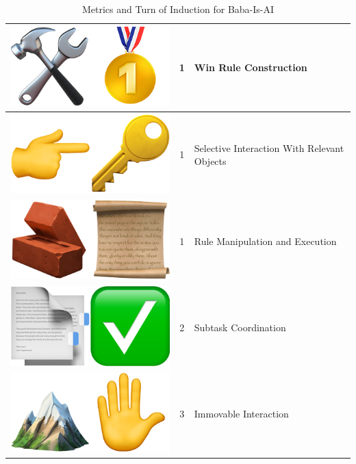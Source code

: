 \begin{table}
\begin{tabular}{ccl}
\midrule
\rowcolor{gray!30} \includegraphics[scale=0.07]{figs/emojis/emoji_5.png} & 1 & Win Rule Construction \\
\midrule
\rowcolor{gray!30} \includegraphics[scale=0.07]{figs/emojis/emoji_6.png} & 1 & Selective Interaction With Relevant Objects  \\
\midrule
\rowcolor{gray!30} \includegraphics[scale=0.07]{figs/emojis/emoji_7.png} & 1 & Rule Manipulation and Execution  \\
\midrule
\rowcolor{gray!60} \includegraphics[scale=0.07]{figs/emojis/emoji_8.png} & 2 & Subtask Coordination \\
\midrule
\rowcolor{gray!90} \includegraphics[scale=0.07]{figs/emojis/emoji_9.png} & 3 & Immovable Interaction \\
\bottomrule
\end{tabular}
\caption{Metrics and Turn of Induction \newline for Baba-Is-AI}
\label{tab:baba_is_ai_metrics}
\end{table}

